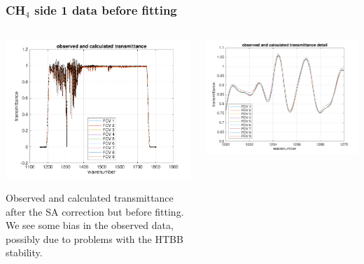 \documentclass[10pt]{beamer}
\begin{document}
\begin{frame}
\frametitle{CH$_4$ side 1 data before fitting}
\begin{columns}[t]
\begin{column}{0.5\textwidth}  
  \begin{centering}
  \includegraphics[width=\textwidth]{01-07_pfl_s1_CH4/spec_test2_all.png}
  \end{centering}\vspace{3mm}

Observed and calculated transmittance after the SA correction but
before fitting.  We see some bias in the observed data, possibly due
to problems with the HTBB stability.

\end{column}

\begin{column}{0.5\textwidth}
  \begin{centering}
  \includegraphics[width=\textwidth]{01-07_pfl_s1_CH4/spec_test2_zoom.png}
  \end{centering}\vspace{3mm}


\end{column}
\end{columns}
\end{frame}
\end{document}
